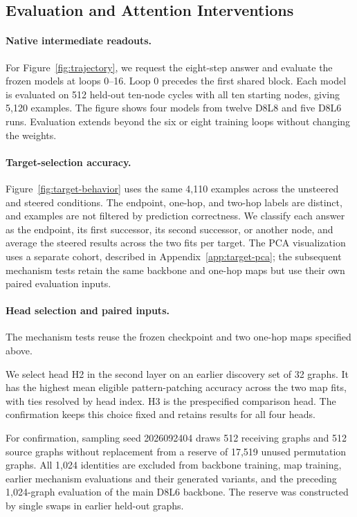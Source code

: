 \documentclass{article}
\begin{document}
\subsection{Evaluation and Attention Interventions}
\label{app:n10-mechanism}
\paragraph{Native intermediate readouts.}
For Figure~\ref{fig:trajectory}, we request the eight-step answer and evaluate the frozen models at loops 0--16. Loop 0 precedes the first shared block. Each model is evaluated on 512 held-out ten-node cycles with all ten starting nodes, giving 5,120 examples. The figure shows four models from twelve D8L8 and five D8L6 runs. Evaluation extends beyond the six or eight training loops without changing the weights.

\paragraph{Target-selection accuracy.}
Figure~\ref{fig:target-behavior} uses the same 4,110 examples across the unsteered and steered conditions. The endpoint, one-hop, and two-hop labels are distinct, and examples are not filtered by prediction correctness. We classify each answer as the endpoint, its first successor, its second successor, or another node, and average the steered results across the two fits per target. The PCA visualization uses a separate cohort, described in Appendix~\ref{app:target-pca}; the subsequent mechanism tests retain the same backbone and one-hop maps but use their own paired evaluation inputs.

\paragraph{Head selection and paired inputs.}
The mechanism tests reuse the frozen checkpoint and two one-hop maps specified above.

We select head H2 in the second layer on an earlier discovery set of 32 graphs. It has the highest mean eligible pattern-patching accuracy across the two map fits, with ties resolved by head index. H3 is the prespecified comparison head. The confirmation keeps this choice fixed and retains results for all four heads.

For confirmation, sampling seed 2026092404 draws 512 receiving graphs and 512 source graphs without replacement from a reserve of 17,519 unused permutation graphs. All 1,024 identities are excluded from backbone training, map training, earlier mechanism evaluations and their generated variants, and the preceding 1,024-graph evaluation of the main D8L6 backbone. The reserve was constructed by single swaps in earlier held-out graphs.
\end{document}
